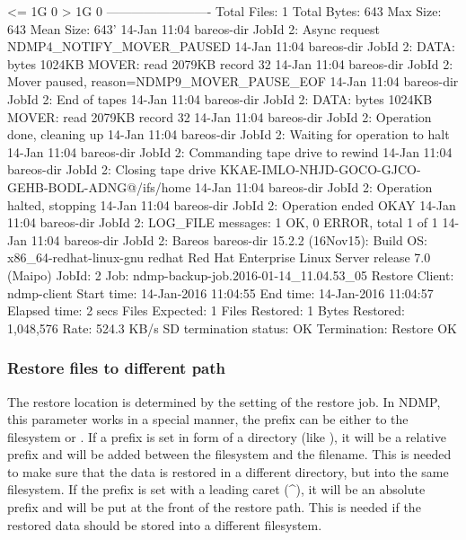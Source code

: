 \begin{bconsole}{}
        <= 1G                   0
         > 1G                   0
        -------------------------
        Total Files:            1
        Total Bytes:            643
        Max Size:               643
        Mean Size:              643'
14-Jan 11:04 bareos-dir JobId 2: Async request NDMP4_NOTIFY_MOVER_PAUSED
14-Jan 11:04 bareos-dir JobId 2: DATA: bytes 1024KB  MOVER: read 2079KB record 32
14-Jan 11:04 bareos-dir JobId 2: Mover paused, reason=NDMP9_MOVER_PAUSE_EOF
14-Jan 11:04 bareos-dir JobId 2: End of tapes
14-Jan 11:04 bareos-dir JobId 2: DATA: bytes 1024KB  MOVER: read 2079KB record 32
14-Jan 11:04 bareos-dir JobId 2: Operation done, cleaning up
14-Jan 11:04 bareos-dir JobId 2: Waiting for operation to halt
14-Jan 11:04 bareos-dir JobId 2: Commanding tape drive to rewind
14-Jan 11:04 bareos-dir JobId 2: Closing tape drive KKAE-IMLO-NHJD-GOCO-GJCO-GEHB-BODL-ADNG@/ifs/home
14-Jan 11:04 bareos-dir JobId 2: Operation halted, stopping
14-Jan 11:04 bareos-dir JobId 2: Operation ended OKAY
14-Jan 11:04 bareos-dir JobId 2: LOG_FILE messages: 1 OK, 0 ERROR, total 1 of 1
14-Jan 11:04 bareos-dir JobId 2: Bareos bareos-dir 15.2.2 (16Nov15):
  Build OS:               x86_64-redhat-linux-gnu redhat Red Hat Enterprise Linux Server release 7.0 (Maipo)
  JobId:                  2
  Job:                    ndmp-backup-job.2016-01-14_11.04.53_05
  Restore Client:         ndmp-client
  Start time:             14-Jan-2016 11:04:55
  End time:               14-Jan-2016 11:04:57
  Elapsed time:           2 secs
  Files Expected:         1
  Files Restored:         1
  Bytes Restored:         1,048,576
  Rate:                   524.3 KB/s
  SD termination status:  OK
  Termination:            Restore OK
\end{bconsole}

\subsubsection{Restore files to different path}
\label{sec:ndmp-where}

The restore location is determined by the  setting of the restore job.
In NDMP, this parameter works in a special manner, the prefix can be either  to the filesystem or .
If a prefix is set in form of a directory (like ), it will be a relative prefix and will be added between the filesystem and the filename. This is needed to make sure that the data is restored in a different directory, but  into the same filesystem.
If the prefix is set with a leading caret (\textasciicircum), it will be an absolute prefix and will be put at the front of the restore path. This is needed if the restored data should be stored into a different filesystem.

